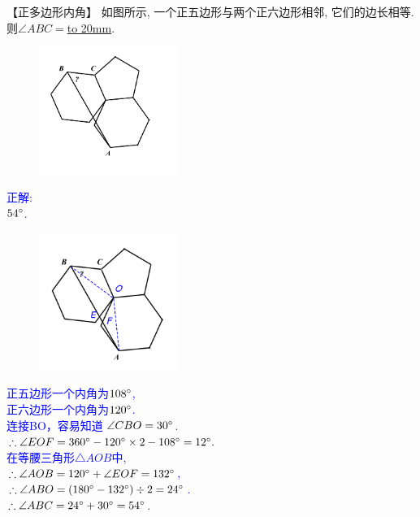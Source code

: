 \item {
    【正多边形内角】
    如图所示, 一个正五边形与两个正六边形相邻, 它们的边长相等. 则$\angle ABC = $\underline{\hbox to 20mm{}}.
    \begin{figure}[H] 
        \centering
        \includegraphics[width=0.4\textwidth]{./pics/Chapter_2/7.png}
    \end{figure}
    \ifshowSolution 
        \fangsong{}\textcolor{blue}{
            正解: \\
            $54\degree$.
            \begin{figure}[H] 
                \centering
                \includegraphics[width=0.4\textwidth]{./pics/Chapter_2/seikai_7.png}
            \end{figure}
            正五边形一个内角为$108\degree$, \\
            正六边形一个内角为$120\degree$. \\
            连接BO，容易知道 $\angle CBO = 30\degree$. \\
            $\therefore \angle EOF = 360\degree - 120\degree \times 2 - 108\degree = 12\degree.$ \\
            $在等腰三角形\triangle AOB 中$, \\
            $\therefore \angle AOB = 120\degree + \angle EOF = 132\degree$,\\
            $\therefore \angle ABO = (180\degree - 132\degree) \div 2 = 24\degree$.\\
            $\therefore \angle ABC = 24\degree + 30\degree = 54\degree$.\\
        }
    \else
        \vspace{1cm}
    \fi
}

